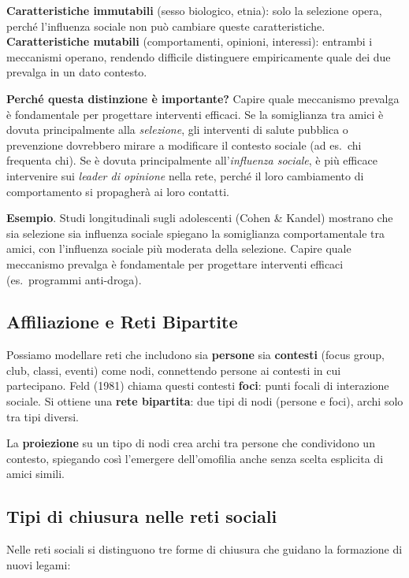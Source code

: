 \documentclass[12pt,a4paper]{article}
\begin{document}
\noindent\textbf{Caratteristiche immutabili} (sesso biologico, etnia): solo la selezione opera, perché
l'influenza sociale non può cambiare queste caratteristiche.\\
\noindent\textbf{Caratteristiche mutabili} (comportamenti, opinioni, interessi): entrambi
i meccanismi operano, rendendo difficile distinguere empiricamente quale dei due prevalga
in un dato contesto.

\medskip
\noindent\textbf{Perché questa distinzione è importante?}
Capire quale meccanismo prevalga è fondamentale per progettare interventi efficaci.
Se la somiglianza tra amici è dovuta principalmente alla \emph{selezione}, gli interventi
di salute pubblica o prevenzione dovrebbero mirare a modificare il contesto sociale (ad es.\
chi frequenta chi). Se è dovuta principalmente all'\emph{influenza sociale}, è più efficace
intervenire sui \emph{leader di opinione} nella rete, perché il loro cambiamento di
comportamento si propagherà ai loro contatti.

\medskip
\noindent\textbf{Esempio}. Studi longitudinali sugli adolescenti (Cohen \& Kandel) mostrano
che sia selezione sia influenza sociale spiegano la somiglianza comportamentale tra amici,
con l'influenza sociale più moderata della selezione. Capire quale meccanismo prevalga è
fondamentale per progettare interventi efficaci (es.\ programmi anti-droga).

\subsection{Affiliazione e Reti Bipartite}

Possiamo modellare reti che includono sia \textbf{persone} sia \textbf{contesti} (focus group,
club, classi, eventi) come nodi, connettendo persone ai contesti in cui partecipano.
Feld (1981) chiama questi contesti \textbf{foci}: punti focali di interazione sociale.
Si ottiene una \textbf{rete bipartita}: due tipi di nodi (persone e foci), archi solo tra tipi diversi.

La \textbf{proiezione} su un tipo di nodi crea archi tra persone che condividono un contesto,
spiegando così l'emergere dell'omofilia anche senza scelta esplicita di amici simili.

\subsection{Tipi di chiusura nelle reti sociali}

Nelle reti sociali si distinguono tre forme di chiusura che guidano la formazione di nuovi legami:
\end{document}
